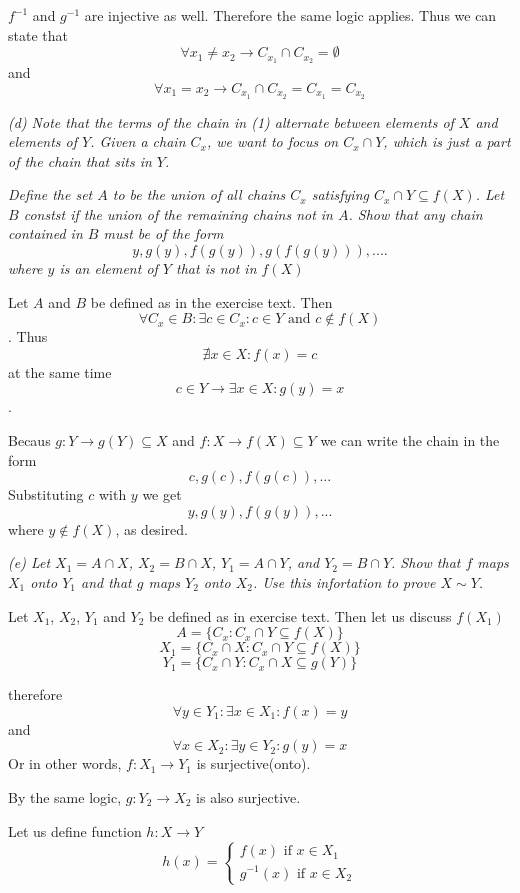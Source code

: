 \documentclass[11pt,oneside,titlepage]{book}
\begin{document}
$f^{-1}$ and $g^{-1}$ are injective as well. Therefore the same logic applies. Thus
we can state that
$$\forall x_1 \neq x_2 \to C_{x_1} \cap C_{x_2} = \emptyset $$
and
$$\forall x_1 = x_2 \to C_{x_1} \cap C_{x_2} = C_{x_1} = C_{x_2} $$

\textit{(d) Note that the terms of the chain in (1) alternate between elements of $X$
  and elements of $Y$. Given a chain $C_x$, we want to focus on $C_x \cap Y$,
  which is just a part of the chain that sits in $Y$.}

\textit{Define the set $A$ to be the union of all chains $C_x$ satisfying
  $C_x \cap Y \subseteq f(X)$. Let $B$ constst if the union of the remaining chains not
  in $A$. Show that any chain contained in $B$ must be of the form}
$$y, g(y), f(g(y)), g(f(g(y))), ....$$
\textit{where $y$ is an element of $Y$ that is not in $f(X)$}

Let $A$ and $B$ be defined as in the exercise text. Then
$$\forall C_x \in B: \exists c \in C_x: c \in Y \text{ and } c \notin f(X)$$.
Thus
$$\nexists x \in X: f(x) = c$$
at the same time
$$c \in Y \to \exists x \in X: g(y) = x$$.

Becaus $g: Y \to g(Y) \subseteq X$ and $f: X \to f(X) \subseteq Y$ we can write
the chain in the form 
$$c, g(c), f(g(c)), ...$$
Substituting $c$ with $y$ we get 
$$y, g(y), f(g(y)), ...$$
where $y \notin f(X)$, as desired.

\textit{(e) Let $X_1 = A \cap X$, $X_2 = B \cap X$, $Y_1 = A \cap Y$, and $Y_2 = B \cap Y$.
  Show that $f$ maps $X_1$ onto $Y_1$ and that $g$ maps $Y_2$ onto $X_2$. Use this
  infortation to prove $X \sim Y$.}

Let $X_1$, $X_2$, $Y_1$ and $Y_2$ be defined as in exercise text. Then
let us discuss $f(X_1)$
$$A = \{C_x: C_x \cap Y \subseteq f(X)\}$$
$$X_1 = \{C_x \cap X: C_x \cap Y \subseteq f(X)\}$$
$$Y_1 = \{C_x \cap Y: C_x \cap X \subseteq g(Y)\}$$

therefore
$$\forall y \in Y_1: \exists x \in X_1: f(x) = y$$
and
$$\forall x \in X_2: \exists y \in Y_2: g(y) = x$$
Or in other words, $f: X_1 \to Y_1$ is surjective(onto).

By the same logic, $g: Y_2 \to X_2$ is also surjective.

Let us define function $h: X \to Y$
\begin {equation}
h(x) =
  \begin{cases}
    f(x) \text{ if } x \in X_1 \\
    g^{-1}(x) \text{ if } x \in X_2
  \end{cases}
\end {equation}
\end{document}
